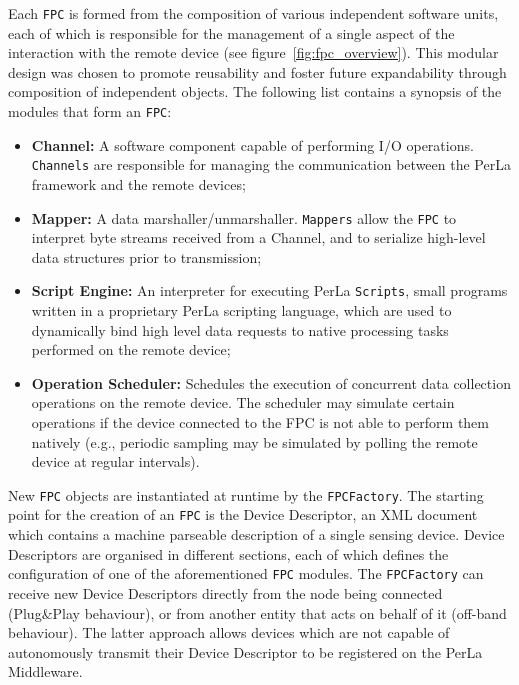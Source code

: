 Each \texttt{FPC} is formed from the composition of various independent
software units, each of which is responsible for the management of a single
aspect of the interaction with the remote device (see
figure~\ref{fig:fpc_overview}). This modular design was chosen to promote
reusability and foster future expandability through composition of
independent objects. The following list contains a synopsis of the modules
that form an \texttt{FPC}:

\begin{itemize}

    \item \textbf{Channel:} A software component capable of performing I/O
    operations. \texttt{Channels} are responsible for managing the
    communication between the PerLa framework and the remote devices;

    \item \textbf{Mapper:} A data marshaller/unmarshaller. \texttt{Mappers}
    allow the \texttt{FPC} to interpret byte streams received from a Channel,
    and to serialize high-level data structures prior to transmission;

    \item \textbf{Script Engine:} An interpreter for executing PerLa
    \texttt{Scripts}, small programs written in a proprietary PerLa scripting
    language, which are used to dynamically bind high level data requests to
    native processing tasks performed on the remote device;

    \item \textbf{Operation Scheduler:} Schedules the execution of concurrent
    data collection operations on the remote device. The scheduler may simulate
    certain operations if the device connected to the FPC is not able to
    perform them natively (e.g., periodic sampling may be simulated by polling
    the remote device at regular intervals).

\end{itemize}

New \texttt{FPC} objects are instantiated at runtime by the
\texttt{FPCFactory}. The starting point for the creation of an \texttt{FPC} is
the Device Descriptor, an XML document which contains a machine parseable
description of a single sensing device. Device Descriptors are organised in
different sections, each of which defines the configuration of one of the
aforementioned \texttt{FPC} modules. The \texttt{FPCFactory} can receive new
Device Descriptors directly from the node being connected (Plug\&Play
behaviour), or from another entity that acts on behalf of it (off-band
behaviour). The latter approach allows devices which are not capable of
autonomously transmit their Device Descriptor to be registered on the PerLa
Middleware.

